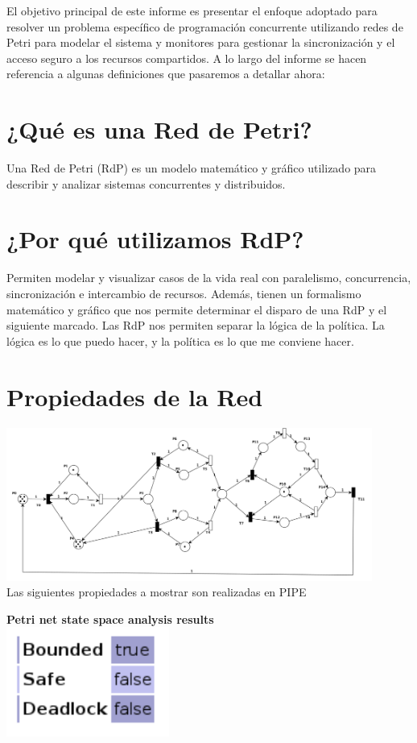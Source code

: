 \documentclass[12pt]{article}
\begin{document}
El objetivo principal de este informe es presentar el enfoque adoptado para resolver un problema específico de programación concurrente utilizando redes de Petri para modelar el sistema y monitores para gestionar la sincronización y el acceso seguro a los recursos compartidos. A lo largo del informe se hacen referencia a algunas definiciones que pasaremos a detallar ahora:

\section{¿Qué es una Red de Petri?}
Una Red de Petri (RdP) es un modelo matemático y gráfico utilizado para describir y analizar sistemas concurrentes y distribuidos.

\section{¿Por qué utilizamos RdP?}
Permiten modelar y visualizar casos de la vida real con paralelismo, concurrencia, sincronización e intercambio de recursos. Además, tienen un formalismo matemático y gráfico que nos permite determinar el disparo de una RdP y el siguiente marcado. Las RdP nos permiten separar la lógica de la política. La lógica es lo que puedo hacer, y la política es lo que me conviene hacer.

\section{Propiedades de la Red}
\begin{center}
    \includegraphics[width=0.9\textwidth]{Petri-Net.png}\\
    {Las siguientes propiedades a mostrar son realizadas en PIPE}
\end{center}

\begin{center}
    \textbf{Petri net state space analysis results}\\
    \includegraphics[width=0.4\textwidth]{Petri-Net-State.png}\\
\end{center}
\end{document}
